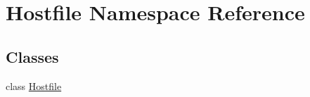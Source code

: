 \hypertarget{namespaceHostfile}{\section{Hostfile Namespace Reference}
\label{namespaceHostfile}
}
\subsection*{Classes}
\begin{DoxyCompactItemize}
\item 
class \hyperlink{classHostfile_1_1Hostfile}{Hostfile}
\end{DoxyCompactItemize}
